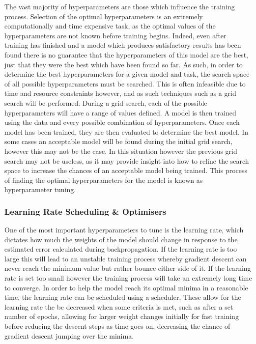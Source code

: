 The vast majority of hyperparameters are those which influence the training process. Selection of the optimal hyperparameters is an extremely computationally and time expensive task, as the optimal values of the hyperparameters are not known before training begins. Indeed, even after training has finished and a model which produces satisfactory results has been found there is no guarantee that the hyperparameters of this model are the best, just that they were the best which have been found so far. As such, in order to determine the best hyperparameters for a given model and task, the search space of all possible hyperparameters must be searched. This is often infeasible due to time and resource constraints however, and as such techniques such as a grid search will be performed. During a grid search, each of the possible hyperparameters will have a range of values defined. A model is then trained using the data and every possible combination of hyperparameters. Once each model has been trained, they are then evaluated to determine the best model. In some cases an acceptable model will be found during the initial grid search, however this may not be the case. In this situation however the previous grid search may not be useless, as it may provide insight into how to refine the search space to increase the chances of an acceptable model being trained. This process of finding the optimal hyperparameters for the model is known as hyperparameter tuning. 

\subsubsection{Learning Rate Scheduling \& Optimisers}\label{ch:cetDet,sec:initialTesting,sub:hyperparameters,subsub:learningRateOptimisers}
One of the most important hyperparameters to tune is the learning rate, which dictates how much the weights of the model should change in response to the estimated error calculated during backpropagation. If the learning rate is too large this will lead to an unstable training process whereby gradient descent can never reach the minimum value but rather bounce either side of it. If the learning rate is set too small however the training process will take an extremely long time to converge. In order to help the model reach its optimal minima in a reasonable time, the learning rate can be scheduled using a scheduler. These allow for the learning rate the be decreased when some criteria is met, such as after a set number of epochs, allowing for larger weight changes initially for fast training before reducing the descent steps as time goes on, decreasing the chance of gradient descent jumping over the minima.

